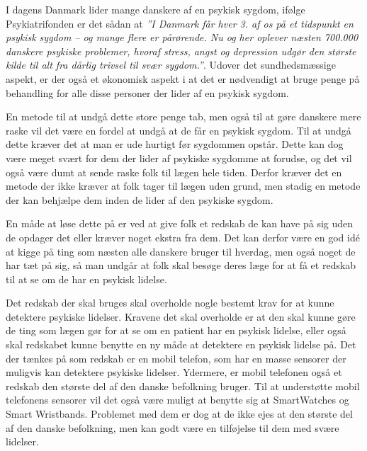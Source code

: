 


I dagens Danmark lider mange danskere af en psykisk sygdom, ifølge Psykiatrifonden er det sådan at \textit{''I Danmark får hver 3. af os på et tidspunkt en psykisk sygdom – og mange flere er pårørende. Nu og her oplever næsten 700.000 danskere psykiske problemer, hvoraf stress, angst og depression udgør den største kilde til alt fra dårlig trivsel til svær sygdom.''}\cite{psykiatrifonden}.
Udover det sundhedsmæssige aspekt, er der også et økonomisk aspekt i at det er nødvendigt at bruge penge på behandling for alle disse personer der lider af en psykisk sygdom.

En metode til at undgå dette store penge tab, men også til at gøre danskere mere raske vil det være en fordel at undgå at de får en psykisk sygdom.
Til at undgå dette kræver det at man er ude hurtigt før sygdommen opstår.
Dette kan dog være meget svært for dem der lider af psykiske sygdomme at forudse, og det vil også være dumt at sende raske folk til lægen hele tiden.
Derfor kræver det en metode der ikke kræver at folk tager til lægen uden grund, men stadig en metode der kan behjælpe dem inden de lider af den psykiske sygdom.

En måde at løse dette på er ved at give folk et redskab de kan have på sig uden de opdager det eller kræver noget ekstra fra dem.
Det kan derfor være en god idé at kigge på ting som næsten alle danskere bruger til hverdag, men også noget de har tæt på sig, så man undgår at folk skal besøge deres læge for at få et redskab til at se om de har en psykisk lidelse.

Det redskab der skal bruges skal overholde nogle bestemt krav for at kunne detektere psykiske lidelser.
Kravene det skal overholde er at den skal kunne gøre de ting som lægen gør for at se om en patient har en psykisk lidelse, eller også skal redskabet kunne benytte en ny måde at detektere en psykisk lidelse på.
Det der tænkes på som redskab er en mobil telefon, som har en masse sensorer der muligvis kan detektere psykiske lidelser. 
Ydermere, er mobil telefonen også et redskab den største del af den danske befolkning bruger.
Til at understøtte mobil telefonens sensorer vil det også være muligt at benytte sig at SmartWatches og Smart Wristbands.
Problemet med dem er dog at de ikke ejes at den største del af den danske befolkning, men kan godt være en tilføjelse til dem med svære lidelser.